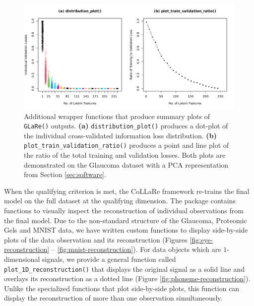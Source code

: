 \begin{figure}
    \centering
    \includegraphics[width=1\linewidth]{figures/additional-plots-01.pdf}
    \caption{Additional wrapper functions that produce summary plots of \texttt{GLaRe()} outputs. \textbf{(a)} \texttt{distribution\_plot()} produces a dot-plot of the individual cross-validated information loss distribution. \textbf{(b)} \texttt{plot\_train\_validation\_ratio()} produces a point and line plot of the ratio of the total training and validation losses.
    Both plots are demonstrated on the Glaucoma dataset with a PCA representation from Section \ref{sec:software}.}
    \label{fig:additional-plots-01}
\end{figure}

When the qualifying criterion is met, the CoLLaRe framework re-trains the final model on the full dataset at the qualifying dimension.
The  package contains functions to visually inspect the reconstruction of individual observations from the final model.
Due to the non-standard structure of the Glaucoma, Proteomic Gels and MNIST data, we have written custom functions to display side-by-side plots of the data observation and its reconstruction (Figures \ref{fig:eye-reconstruction} -- \ref{fig:mnist-reconstruction}).
For data objects which are $1$-dimensional signals, we provide a general function called \texttt{plot\_1D\_reconstruction()} that displays the original signal as a solid line and overlays its reconstruction as a dotted line (Figure \ref{fig:phoneme-reconstruction}).
Unlike the specialized functions that plot side-by-side plots, this function can display the reconstruction of more than one observation simultaneously.

